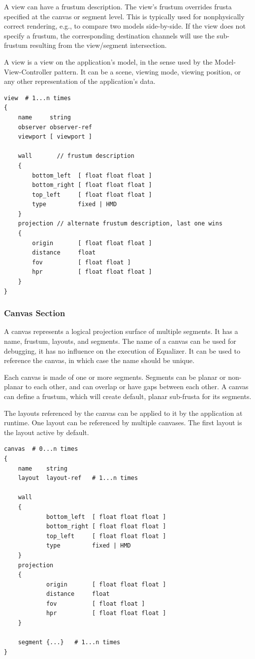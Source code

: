 \documentclass[10pt,a4]{scrartcl}
\begin{document}
A view can have a frustum description. The view's frustum overrides
frusta specified at the canvas or segment level. This is typically used
for nonphysically correct rendering, e.g., to compare two models
side-by-side. If the view does not specify a frustum, the corresponding
destination channels will use the sub-frustum resulting from the
view/segment intersection.

A view is a view on the application's model, in the sense used by the
Model-View-Controller pattern. It can be a scene, viewing mode, viewing
position, or any other representation of the application's data.

{\footnotesize\begin{lstlisting}
view  # 1...n times
{
    name     string
    observer observer-ref
    viewport [ viewport ]

    wall       // frustum description
    {
        bottom_left  [ float float float ]
        bottom_right [ float float float ]
        top_left     [ float float float ]
        type         fixed | HMD
    }
    projection // alternate frustum description, last one wins
    {
        origin       [ float float float ]
        distance     float
        fov          [ float float ]
        hpr          [ float float float ]
    }
}
\end{lstlisting}}

\subsubsection{Canvas Section}

A canvas represents a logical projection surface of multiple
segments. It has a name, frustum, layouts, and segments. The name of a
canvas can be used for debugging, it has no influence on the execution
of Equalizer. It can be used to reference the canvas, in which case the
name should be unique.

Each canvas is made of one or more segments. Segments can be planar or
non-planar to each other, and can overlap or have gaps between each
other. A canvas can define a frustum, which will create default, planar
sub-frusta for its segments.

The layouts referenced by the canvas can be applied to it by the
application at runtime. One layout can be referenced by multiple
canvases. The first layout is the layout active by default.

{\footnotesize\begin{lstlisting}
canvas  # 0...n times
{
    name    string
    layout  layout-ref   # 1...n times

    wall       
    {
            bottom_left  [ float float float ]
            bottom_right [ float float float ]
            top_left     [ float float float ]
            type         fixed | HMD
    }
    projection
    {
            origin       [ float float float ]
            distance     float
            fov          [ float float ]
            hpr          [ float float float ]
    }
    
    segment {...}   # 1...n times
}
\end{lstlisting}}
\end{document}
